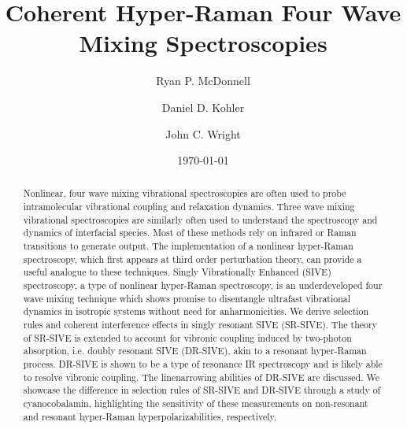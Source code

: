 \documentclass[aip, jcp, reprint, onecolumn]{revtex4-2}
\begin{document}
\title{Coherent Hyper-Raman Four Wave Mixing Spectroscopies}

\author{Ryan P. McDonnell} 
\author{Daniel D. Kohler}
\author{John C. Wright} 


\date{\today}

\begin{abstract}
Nonlinear, four wave mixing vibrational spectroscopies are often used to probe intramolecular vibrational coupling and relaxation dynamics.
Three wave mixing vibrational spectroscopies are similarly often used to understand the spectroscopy and dynamics of interfacial species.
Most of these methods rely on infrared or Raman transitions to generate output. 
The implementation of a nonlinear hyper-Raman spectroscopy, which first appears at third order perturbation theory, can provide a useful analogue to these techniques.
Singly Vibrationally Enhanced (SIVE) spectroscopy, a type of nonlinear hyper-Raman spectroscopy, is an underdeveloped four wave mixing technique which shows promise to disentangle ultrafast vibrational dynamics in isotropic systems without need for anharmonicities.
We derive selection rules and coherent interference effects in singly resonant SIVE (SR-SIVE).
The theory of SR-SIVE is extended to account for vibronic coupling induced by two-photon absorption, i.e. doubly resonant SIVE (DR-SIVE), akin to a resonant hyper-Raman process. 
DR-SIVE is shown to be a type of resonance IR spectroscopy and is likely able to resolve vibronic coupling.
The linenarrowing abilities of DR-SIVE are discussed.
We showcase the difference in selection rules of SR-SIVE and DR-SIVE through a study of cyanocobalamin, highlighting the sensitivity of these measurements on non-resonant and resonant hyper-Raman hyperpolarizabilities, respectively.
\end{abstract}

\maketitle
\end{document}
